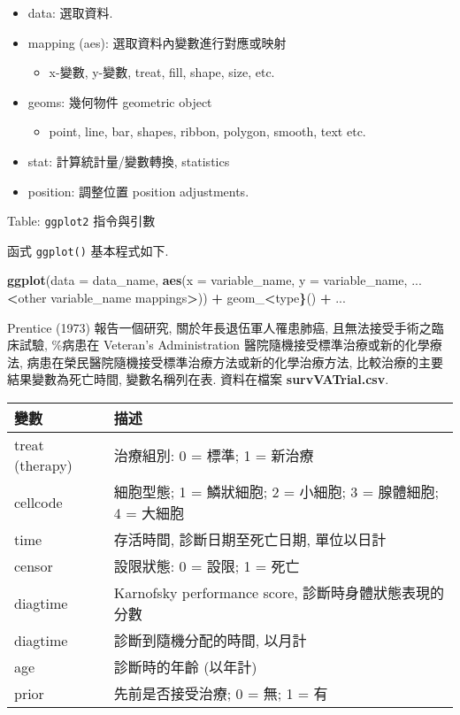 \documentclass[
]{book}
\newenvironment{Shaded}{\begin{snugshade}}{\end{snugshade}}
\newcommand{\DataTypeTok}[1]{\textcolor[rgb]{0.13,0.29,0.53}{#1}}
\newcommand{\ErrorTok}[1]{\textcolor[rgb]{0.64,0.00,0.00}{\textbf{#1}}}
\newcommand{\KeywordTok}[1]{\textcolor[rgb]{0.13,0.29,0.53}{\textbf{#1}}}
\newcommand{\NormalTok}[1]{#1}
\newcommand{\OperatorTok}[1]{\textcolor[rgb]{0.81,0.36,0.00}{\textbf{#1}}}
\newcommand{\StringTok}[1]{\textcolor[rgb]{0.31,0.60,0.02}{#1}}
\providecommand{\tightlist}{%
  \setlength{\itemsep}{0pt}\setlength{\parskip}{0pt}}
\begin{document}
\begin{itemize}
\tightlist
\item
  data: 選取資料.
\item
  mapping (aes): 選取資料內變數進行對應或映射

  \begin{itemize}
  \tightlist
  \item
    x-變數, y-變數, treat, fill, shape, size, etc.
  \end{itemize}
\item
  geoms: 幾何物件 geometric object

  \begin{itemize}
  \tightlist
  \item
    point, line, bar, shapes, ribbon, polygon, smooth, text etc.
  \end{itemize}
\item
  stat: 計算統計量/變數轉換, statistics
\item
  position: 調整位置 position adjustments.
\end{itemize}

Table: \texttt{ggplot2} 指令與引數

函式 \texttt{ggplot()} 基本程式如下.

\begin{Shaded}
\begin{Highlighting}[]
\KeywordTok{ggplot}\NormalTok{(}\DataTypeTok{data =}\NormalTok{ data\_name, }
       \KeywordTok{aes}\NormalTok{(}\DataTypeTok{x =}\NormalTok{ variable\_name,}
           \DataTypeTok{y =}\NormalTok{ variable\_name,}
\NormalTok{           ... }\OperatorTok{\textless{}}\NormalTok{other variable\_name mappings}\OperatorTok{\textgreater{}}\NormalTok{)) }\OperatorTok{+}
\StringTok{  }\NormalTok{geom\_}\OperatorTok{\textless{}}\NormalTok{type}\ErrorTok{\}}\NormalTok{() }\OperatorTok{+}\StringTok{ }
\StringTok{  }\NormalTok{...}
\end{Highlighting}
\end{Shaded}

Prentice (1973) 報告一個研究,
關於年長退伍軍人罹患肺癌, 且無法接受手術之臨床試驗,
\%病患在 Veteran's Administration 醫院隨機接受標準治療或新的化學療法,
病患在榮民醫院隨機接受標準治療方法或新的化學治療方法,
比較治療的主要結果變數為死亡時間,
變數名稱列在表.
資料在檔案 \textbf{survVATrial.csv}.

\begin{longtable}[]{@{}ll@{}}
\toprule
變數 & 描述\tabularnewline
\midrule
\endhead
treat (therapy) & 治療組別: 0 = 標準; 1 = 新治療\tabularnewline
cellcode & 細胞型態; 1 = 鱗狀細胞; 2 = 小細胞; 3 = 腺體細胞; 4 = 大細胞\tabularnewline
time & 存活時間, 診斷日期至死亡日期, 單位以日計\tabularnewline
censor & 設限狀態: 0 = 設限; 1 = 死亡\tabularnewline
diagtime & Karnofsky performance score, 診斷時身體狀態表現的分數\tabularnewline
diagtime & 診斷到隨機分配的時間, 以月計\tabularnewline
age & 診斷時的年齡 (以年計)\tabularnewline
prior & 先前是否接受治療; 0 = 無; 1 = 有\tabularnewline
\bottomrule
\end{longtable}
\end{document}
